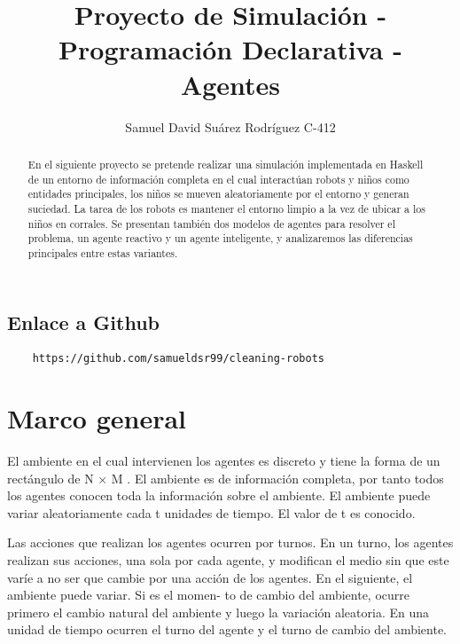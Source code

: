 \documentclass[]{article}
\title{Proyecto de Simulaci\'on - Programaci\'on Declarativa - Agentes}
\author{Samuel David Su\'arez Rodr\'iguez C-412}
\begin{document}
\maketitle

\begin{abstract}
En el siguiente proyecto se pretende realizar una simulación implementada en Haskell de un entorno de información completa en el cual interactúan robots y niños como entidades principales, los niños se mueven aleatoriamente por el entorno y generan suciedad. La tarea de los robots es mantener el entorno limpio a la vez de ubicar a los niños en corrales. Se presentan también dos modelos de agentes para resolver el problema, un agente reactivo y un agente inteligente, y analizaremos las diferencias principales entre estas variantes.
\end{abstract}

\subsection{Enlace a Github}

\begin{verbatim}
	https://github.com/samueldsr99/cleaning-robots
\end{verbatim}

\section{Marco general}

\begin{flushleft}
	El ambiente en el cual intervienen los agentes es discreto y tiene la forma de un rectángulo
	de N × M . El ambiente es de información completa, por tanto todos los agentes conocen toda
	la información sobre el ambiente. El ambiente puede variar aleatoriamente cada t unidades de
	tiempo. El valor de t es conocido.
\end{flushleft}

\begin{flushleft}
	Las acciones que realizan los agentes ocurren por turnos. En un turno, los agentes realizan
	sus acciones, una sola por cada agente, y modifican el medio sin que este varíe a no ser que
	cambie por una acción de los agentes. En el siguiente, el ambiente puede variar. Si es el momen-
	to de cambio del ambiente, ocurre primero el cambio natural del ambiente y luego la variación
	aleatoria. En una unidad de tiempo ocurren el turno del agente y el turno de cambio del ambiente.
\end{flushleft}
\end{document}
